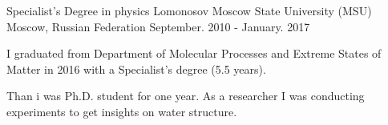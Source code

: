 

\begin{cventries}

  \cventry
    {Specialist's Degree in physics} %
    {Lomonosov Moscow State University (MSU)} %
    {Moscow, Russian Federation} %
    {September. 2010 - January. 2017} %
    {
      \begin{cvitems} %
        \item {I graduated from Department of Molecular Processes and 
        Extreme States of Matter in 2016 with a Specialist's degree (5.5 years).}
        \item {Than i was Ph.D. student for one year. As a researcher I was 
        conducting experiments to get insights on water structure.}
      \end{cvitems}
    }

\end{cventries}
